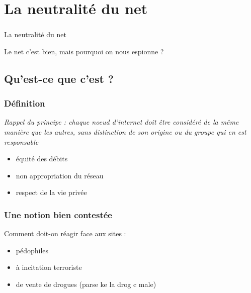 

\section{La neutralité du net}
\begin{frame}\frametitle{}
    {\Huge La neutralité du net}

    \vspace{2em}

    Le net c'est bien, mais pourquoi on nous espionne ?
\end{frame}


\subsection{Qu'est-ce que c'est ?}
\begin{frame}\frametitle{Définition}
    \emph{Rappel du principe : chaque noeud d'internet doit être considéré de
        la même manière que les autres, sans distinction de son origine ou du
    groupe qui en est responsable}
    \vspace{1em}

    \begin{itemize}
        \item équité des débits
        \item non appropriation du réseau
        \item respect de la vie privée
    \end{itemize}
\end{frame}


\begin{frame}\frametitle{Une notion bien contestée}
    Comment doit-on réagir face aux sites :
    \begin{itemize}
        \item pédophiles
        \item à incitation terroriste
        \item de vente de drogues (parse ke la drog c male)
    \end{itemize}
\end{frame}


